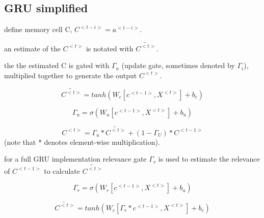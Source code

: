 \documentclass[4apaper,12pt]{book}
\begin{document}
\begin{description}
\begin{description}
\begin{description}
        \subsection{GRU simplified}
        \begin{description}
        \item define memory cell C, $C^{<t-i>} = a^{<t-i>}$.
        \item an estimate of the $C^{<t>}$ is notated with  $\tilde{C^{<t>}}$.
        \item the the estimated C is gated with $\Gamma_u$ (update gate, sometimes denoted by $\Gamma_i$), multiplied together to generate the output $C^{<t>}$.
        \item $$\tilde{C^{<t>}}=tanh(W_c[c^{<t-1>},X^{<t>}]+b_c) $$
        \item $$ \Gamma_u = \sigma(W_u[c^{<t-1>},X^{<t>}]+b_u) $$
        \item $$ C^{<t>}=\Gamma_u * \tilde{C^{<t>}} + (1-\Gamma_U)*C^{<t-1>}$$ (note that * denotes element-wise multiplication).
        \end{description}
      \end{description}
    \item for a full GRU implementation relevance gate $\Gamma_r$ is used to estimate the relevance of $C^{<t-1>}$ to calculate $\tilde{C^{<t>}}$
    \item \item $$ \Gamma_r = \sigma(W_r[c^{<t-1>},X^{<t>}]+b_u) $$
    \item $$\tilde{C^{<t>}}=tanh(W_c[\Gamma_r*c^{<t-1>},X^{<t>}]+b_c) $$
    \end{description}

\end{description}
\end{document}
